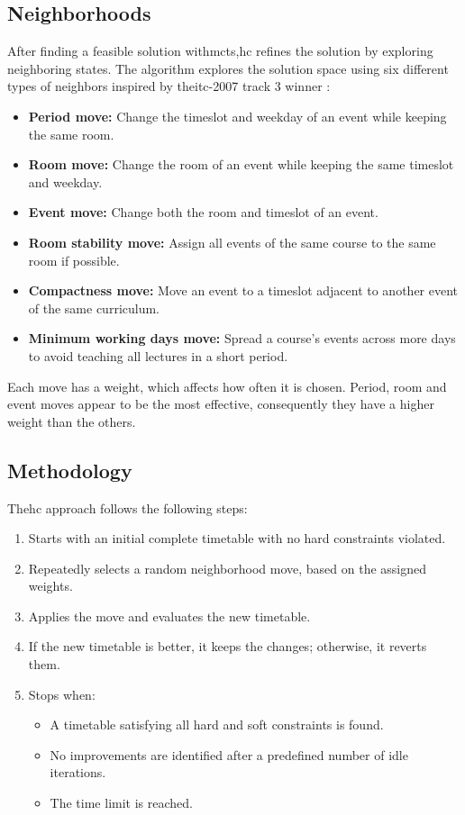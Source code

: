 \subsection{Neighborhoods}

After finding a feasible solution with\ac{mcts},\ac{hc} refines the solution by exploring neighboring states. The algorithm explores the solution space using six different types of neighbors inspired by the\ac{itc-2007} track 3 winner \cite{muller_itc2007}:

\begin{itemize}
\item \textbf{Period move:} Change the timeslot and weekday of an event while keeping the same room.
\item \textbf{Room move:} Change the room of an event while keeping the same timeslot and weekday.
\item \textbf{Event move:} Change both the room and timeslot of an event.
\item \textbf{Room stability move:} Assign all events of the same course to the same room if possible.
\item \textbf{Compactness move:} Move an event to a timeslot adjacent to another event of the same curriculum.
\item \textbf{Minimum working days move:} Spread a course's events across more days to avoid teaching all lectures in a short period.
\end{itemize}

Each move has a weight, which affects how often it is chosen. Period, room and event moves appear to be the most effective, consequently they have a higher weight than the others.

\subsection{Methodology}

The\ac{hc} approach follows the following steps:

\begin{enumerate}
\item Starts with an initial complete timetable with no hard constraints violated.
\item Repeatedly selects a random neighborhood move, based on the assigned weights.
\item Applies the move and evaluates the new timetable.
\item If the new timetable is better, it keeps the changes; otherwise, it reverts them.
\item Stops when:
	\begin{itemize}
	\item A timetable satisfying all hard and soft constraints is found.
	\item No improvements are identified after a predefined number of idle iterations.
	\item The time limit is reached.
	\end{itemize}
\end{enumerate}

